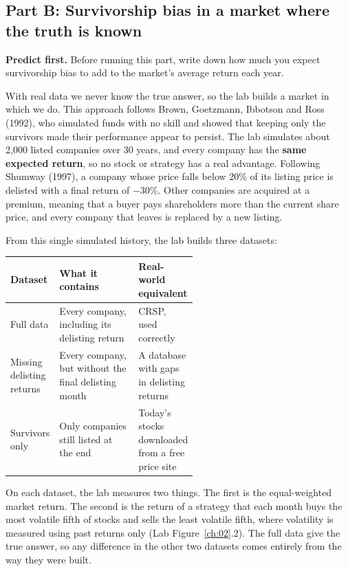 \subsection*{Part B: Survivorship bias in a market where the truth is known}

\textbf{Predict first.} Before running this part, write down how much you expect survivorship bias to add to the market's average return each year.

With real data we never know the true answer, so the lab builds a market in which we do. This approach follows Brown, Goetzmann, Ibbotson and Ross (1992), who simulated funds with no skill and showed that keeping only the survivors made their performance appear to persist. The lab simulates about 2,000 listed companies over 30 years, and every company has the \textbf{same expected return}, so no stock or strategy has a real advantage. Following Shumway (1997), a company whose price falls below 20\% of its listing price is delisted with a final return of $-30$\%. Other companies are acquired at a premium, meaning that a buyer pays shareholders more than the current share price, and every company that leaves is replaced by a new listing.

From this single simulated history, the lab builds three datasets:

\begin{center}
\small
\begin{tabularx}{0.9\linewidth}{@{}>{\raggedright\arraybackslash}p{0.26\linewidth}>{\raggedright\arraybackslash}X>{\raggedright\arraybackslash}p{0.28\linewidth}@{}}
\toprule
Dataset & What it contains & Real-world equivalent \\
\midrule
Full data & Every company, including its delisting return & CRSP, used correctly \\
Missing delisting returns & Every company, but without the final delisting month & A database with gaps in delisting returns \\
Survivors only & Only companies still listed at the end & Today's stocks downloaded from a free price site \\
\bottomrule
\end{tabularx}
\end{center}

On each dataset, the lab measures two things. The first is the equal-weighted market return. The second is the return of a strategy that each month buys the most volatile fifth of stocks and sells the least volatile fifth, where volatility is measured using past returns only (Lab Figure~\ref{ch:02}.2). The full data give the true answer, so any difference in the other two datasets comes entirely from the way they were built.

